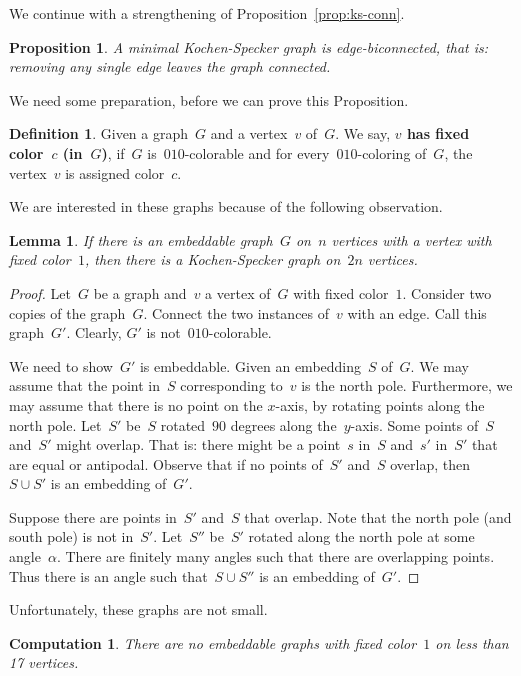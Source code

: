 \documentclass[adraft,copyright,creativecommons]{eptcs}
\newcommand{\keyword}[1]{\textbf{#1}}
\newcounter{main}
\newtheorem{prop}[main]{Proposition}
\newtheorem{comp}[main]{Computation}
\newtheorem{lem}[main]{Lemma}
\theoremstyle{definition}
\newtheorem{dfn}[main]{Definition}
\theoremstyle{remark}
\begin{document}
We continue with a strengthening of Proposition~\ref{prop:ks-conn}.
\begin{prop}\label{prop:ks-biconn}
A minimal Kochen-Specker graph is edge-biconnected,
that is: removing any single edge leaves the graph connected.
\end{prop}
We need some preparation, before we can prove this Proposition.
\begin{dfn}
Given a graph~$G$ and a vertex~$v$ of~$G$.
We say, \keyword{$v$ has fixed color~$c$ (in~$G$)},
if~$G$ is~$010$-colorable
and for every~$010$-coloring of~$G$,
the vertex~$v$ is assigned color~$c$.
\end{dfn}
We are interested in these graphs because of the following observation.
\begin{lem}\label{lem:biconn}
If there is an embeddable graph~$G$ on~$n$ vertices with a vertex
with fixed color~$1$,
then there is a Kochen-Specker graph on~$2n$ vertices.
\end{lem}
\begin{proof}
Let~$G$ be a graph and~$v$ a vertex of~$G$ with fixed color~$1$.
Consider two copies of the graph~$G$.
Connect the two instances of~$v$ with an edge.
Call this graph~$G'$.
Clearly, $G'$ is not~$010$-colorable.

We need to show~$G'$ is embeddable.
Given an embedding~$S$ of~$G$.
We may assume that the point in~$S$ corresponding to~$v$
is the north pole.
Furthermore, we may assume that there is no point on the $x$-axis,
by rotating points along the north pole.
Let~$S'$ be~$S$ rotated~$90$ degrees along the~$y$-axis.
Some points of~$S$ and~$S'$ might overlap.
That is: there might be a point~$s$ in~$S$ and~$s'$ in~$S'$
that are equal or antipodal.
Observe that if no points of~$S'$ and~$S$ overlap,
then~$S \cup S'$ is an embedding of~$G'$.

Suppose there are points in~$S'$ and~$S$
that overlap.
Note that the north pole (and south pole) is not in~$S'$. 
Let~$S''$ be~$S'$ rotated along the north pole at some angle~$\alpha$.
There are finitely many angles such that there are overlapping points.
Thus there is an angle such that~$S \cup S''$ is an embedding of~$G'$.
\end{proof}
Unfortunately, these graphs are not small.


\begin{comp}\label{comp:bic1}
    There are no embeddable graphs with fixed color~$1$
    on less than 17 vertices.
\end{comp}
\end{document}
